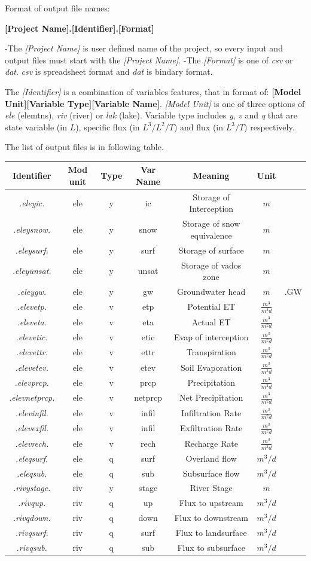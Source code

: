 \documentclass[]{scrbook}
\begin{document}
Format of output file names:

\textbf{{[}Project Name{]}.{[}Identifier{]}.{[}Format{]}}

-The \emph{{[}Project Name{]}} is user defined name of the project, so
every input and output files must start with the \emph{{[}Project
Name{]}}. -The \emph{{[}Format{]}} is one of \emph{csv} or \emph{dat}.
\emph{csv} is spreadsheet format and \emph{dat} is bindary format.

The \emph{{[}Identifier{]}} is a combination of variables features, that
in format of: \textbf{{[}Model Unit{]}{[}Variable Type{]}{[}Variable
Name{]}}. \emph{{[}Model Unit{]}} is one of three options of \emph{ele}
(elemtns), \emph{riv} (river) or \emph{lak} (lake). Variable type
includes \emph{y}, \emph{v} and \emph{q} that are state variable (in
\(L\)), specific flux (in \(L^3/L^2/T\)) and flux (in \(L^3/T\))
respectively.

The list of output files is in following table.

\begin{longtable}[]{@{}ccccccc@{}}
\toprule
Identifier & Mod unit & Type & Var Name & Meaning & Unit\tabularnewline
\midrule
\endhead
\emph{.eleyic.} & ele & y & ic & Storage of Interception & \(m\)
&\tabularnewline
\emph{.eleysnow.} & ele & y & snow & Storage of snow equivalence & \(m\)
&\tabularnewline
\emph{.eleysurf.} & ele & y & surf & Storage of surface & \(m\)
&\tabularnewline
\emph{.eleyunsat.} & ele & y & unsat & Storage of vados zone & \(m\)
&\tabularnewline
\emph{.eleygw.} & ele & y & gw & Groundwater head & \(m\) &
.GW\tabularnewline
\emph{.elevetp.} & ele & v & etp & Potential ET & \(\frac{m^3}{m^2 d}\)
&\tabularnewline
\emph{.eleveta.} & ele & v & eta & Actual ET & \(\frac{m^3}{m^2 d}\)
&\tabularnewline
\emph{.elevetic.} & ele & v & etic & Evap of interception &
\(\frac{m^3}{m^2 d}\) &\tabularnewline
\emph{.elevettr.} & ele & v & ettr & Transpiration &
\(\frac{m^3}{m^2 d}\) &\tabularnewline
\emph{.elevetev.} & ele & v & etev & Soil Evaporation &
\(\frac{m^3}{m^2 d}\) &\tabularnewline
\emph{.elevprcp.} & ele & v & prcp & Precipitation &
\(\frac{m^3}{m^2 d}\) &\tabularnewline
\emph{.elevnetprcp.} & ele & v & netprcp & Net Precipitation &
\(\frac{m^3}{m^2 d}\) &\tabularnewline
\emph{.elevinfil.} & ele & v & infil & Infiltration Rate &
\(\frac{m^3}{m^2 d}\) &\tabularnewline
\emph{.elevexfil.} & ele & v & infil & Exfiltration Rate &
\(\frac{m^3}{m^2 d}\) &\tabularnewline
\emph{.elevrech.} & ele & v & rech & Recharge Rate &
\(\frac{m^3}{m^2 d}\) &\tabularnewline
\emph{.eleqsurf.} & ele & q & surf & Overland flow & \(m^3/d\)
&\tabularnewline
\emph{.eleqsub.} & ele & q & sub & Subsurface flow & \(m^3/d\)
&\tabularnewline
\emph{.rivystage.} & riv & y & stage & River Stage & \(m\)
&\tabularnewline
\emph{.rivqup.} & riv & q & up & Flux to upstream & \(m^3/d\)
&\tabularnewline
\emph{.rivqdown.} & riv & q & down & Flux to downstream & \(m^3/d\)
&\tabularnewline
\emph{.rivqsurf.} & riv & q & surf & Flux to landsurface & \(m^3/d\)
&\tabularnewline
\emph{.rivqsub.} & riv & q & sub & Flux to subsurface & \(m^3/d\)
&\tabularnewline
\bottomrule
\end{longtable}
\end{document}
